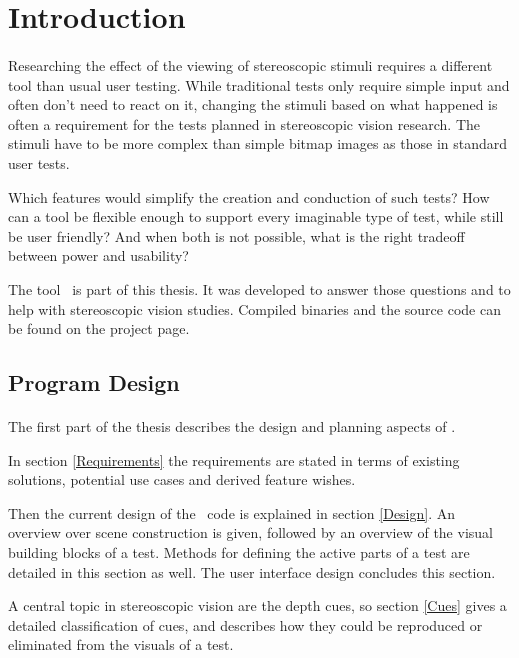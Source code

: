 \section{Introduction\label{Introduction}}
\paragraph{}
Researching the effect of the viewing of stereoscopic stimuli requires a different tool than usual user testing.
While traditional tests only require simple input and often don't need to react on it, changing the stimuli based on what happened is often a requirement for the tests planned in stereoscopic vision research.
The stimuli have to be more complex than simple bitmap images as those in standard user tests.

Which features would simplify the creation and conduction of such tests?
How can a tool be flexible enough to support every imaginable type of test, while still be user friendly?
And when both is not possible, what is the right tradeoff between power and usability?

The tool \ER\ is part of this thesis.
It was developed to answer those questions and to help with stereoscopic vision studies.
Compiled binaries and the source code can be found on the project page\cite{project}.


\subsection{Program Design}
\paragraph{}
The first part of the thesis describes the design and planning aspects of \ER.

In section \ref{Requirements} the requirements are stated in terms of existing solutions, potential use cases and derived feature wishes.

Then the current design of the \ER\ code is explained in section \ref{Design}.
An overview over scene construction is given, followed by an overview of the visual building blocks of a test.
Methods for defining the active parts of a test are detailed in this section as well.
The user interface design concludes this section.

A central topic in stereoscopic vision are the depth cues, so section \ref{Cues} gives a detailed classification of cues, and describes how they could be reproduced or eliminated from the visuals of a test.


